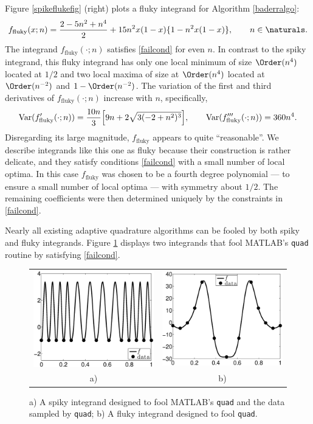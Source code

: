 \documentclass[]{article}
\DeclareMathOperator{\Var}{Var}
\theoremstyle{definition}
\theoremstyle{remark}
\begin{document}
Figure \ref{spikeflukefig} (right) plots a fluky integrand for Algorithm \ref{baderralgo}:
\begin{equation} \label{fluky}
f_{\text{fluky}}(x;n) = \frac{2 - 5 n^2 + n^4}{2}+ 15n^2 x(1-x)\{1 - n^2 x(1-x)\}, \qquad n \in \naturals.
\end{equation}
The integrand $f_{\text{fluky}}(\cdot;n)$ satisfies \eqref{failcond} for even $n$.   In contrast to the spiky integrand, this fluky integrand has only one local minimum of size $\Order(n^4)$ located at $1/2$ and two local maxima of size at $\Order(n^4)$ located at $\Order(n^{-2})$ and $1-\Order(n^{-2})$.  The variation of the first and third derivatives of $f_{\text{fluky}}(\cdot;n)$ increase with $n$, specifically,
\begin{equation*}
\Var(f'_{\text{fluky}}(\cdot;n))= \frac{10 n}{3}  \Bigl[9 n + 2 \sqrt{3(-2 + n^2)^3} \Bigr ], \qquad
\Var(f'''_{\text{fluky}}(\cdot;n))= 360n^4.
\end{equation*}
Disregarding its large magnitude, $f_{\text{fluky}}$ appears to quite ``reasonable''.  We describe integrands like this one as fluky because their construction is rather delicate, and they satisfy conditions \eqref{failcond} with a small number of local optima.  In this case $f_{\text{fluky}}$ was chosen to be a fourth degree polynomial --- to ensure a small number of local optima --- with symmetry about $1/2$.  The remaining coefficients were then determined uniquely by the constraints in \eqref{failcond}.  

Nearly all existing adaptive quadrature algorithms can be fooled by both spiky and fluky integrands.  Figure \ref{fig:foolquad} displays two integrands that fool MATLAB's {\tt quad} routine by satisfying \eqref{failcond}.

\begin{figure}
\centering 
\begin{tabular}{cc}
\includegraphics[width=5.5cm]{ExpositoryPaperSpikyquad.eps}
&
\includegraphics[width=5.5cm]{ExpositoryPaperFlukyquad.eps} \\
a) & b)
\end{tabular}
\caption{a) A spiky integrand designed to fool MATLAB's {\tt quad} and the data sampled by {\tt quad}; b) A fluky integrand designed to fool {\tt quad}. \label{fig:foolquad}}
\end{figure}
\end{document}
